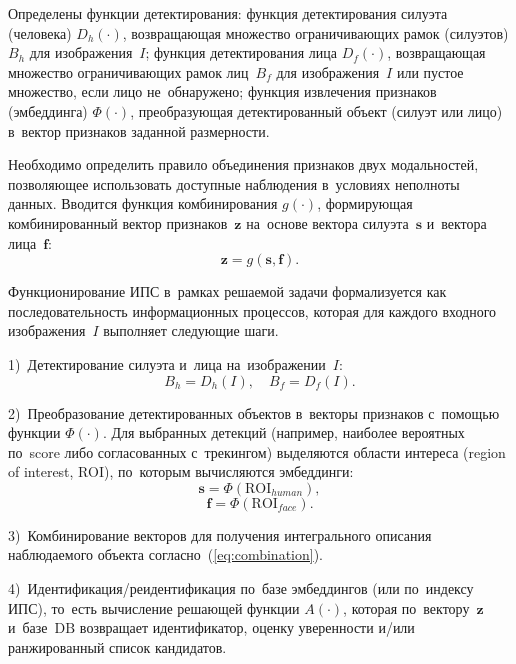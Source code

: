 Определены функции детектирования: функция детектирования силуэта (человека)
$D_h(\cdot)$, возвращающая множество ограничивающих рамок (силуэтов) $B_h$
для изображения~$I$; функция детектирования лица $D_f(\cdot)$, возвращающая
множество ограничивающих рамок лиц~$B_f$ для изображения~$I$ или пустое множество,
если лицо не~обнаружено; функция извлечения признаков (эмбеддинга) $\Phi(\cdot)$,
преобразующая детектированный объект (силуэт или лицо) в~вектор признаков заданной
размерности.

Необходимо определить правило объединения признаков двух модальностей,
позволяющее использовать доступные наблюдения в~условиях неполноты данных.
Вводится функция комбинирования $g(\cdot)$, формирующая комбинированный вектор
признаков~$\mathbf{z}$ на~основе вектора силуэта~$\mathbf{s}$ и~вектора
лица~$\mathbf{f}$:
\begin{equation}
    \mathbf{z}=g(\mathbf{s},\mathbf{f}).
    \label{eq:combination}
\end{equation}

Функционирование ИПС в~рамках решаемой задачи формализуется как последовательность
информационных процессов, которая для каждого входного изображения~$I$ выполняет
следующие шаги.

1)~Детектирование силуэта и~лица на~изображении~$I$:
\begin{equation}
    B_h=D_h(I),\quad B_f=D_f(I).
    \label{eq:detection}
\end{equation}

2)~Преобразование детектированных объектов в~векторы признаков с~помощью функции
$\Phi(\cdot)$. Для выбранных детекций (например, наиболее вероятных по~score либо
согласованных с~трекингом) выделяются области интереса (region of interest, ROI),
по~которым вычисляются эмбеддинги:
\begin{equation}
    \mathbf{s}=\Phi(\mathrm{ROI}_{human}),
    \label{eq:emb-human}
\end{equation}
\begin{equation}
    \mathbf{f}=\Phi(\mathrm{ROI}_{face}).
    \label{eq:emb-face}
\end{equation}

3)~Комбинирование векторов для получения интегрального описания наблюдаемого
объекта согласно~(\ref{eq:combination}).

4)~Идентификация/реидентификация по~базе эмбеддингов (или по~индексу ИПС),
то~есть вычисление решающей функции $A(\cdot)$, которая по~вектору~$\mathbf{z}$
и~базе~$\mathrm{DB}$ возвращает идентификатор, оценку уверенности и/или
ранжированный список кандидатов.

